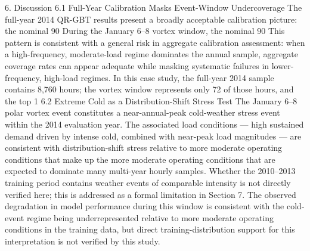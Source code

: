 6. Discussion
6.1 Full-Year Calibration Masks Event-Window Undercoverage
The full-year 2014 QR-GBT results present a broadly acceptable calibration picture: the nominal 90%
During the January 6–8 vortex window, the nominal 90%
This pattern is consistent with a general risk in aggregate calibration assessment: when a high-frequency, moderate-load regime dominates the annual sample, aggregate coverage rates can appear adequate while masking systematic failures in lower-frequency, high-load regimes. In this case study, the full-year 2014 sample contains 8,760 hours; the vortex window represents only 72 of those hours, and the top 1%
6.2 Extreme Cold as a Distribution-Shift Stress Test
The January 6–8 polar vortex event constitutes a near-annual-peak cold-weather stress event within the 2014 evaluation year. The associated load conditions — high sustained demand driven by intense cold, combined with near-peak load magnitudes — are consistent with distribution-shift stress relative to more moderate operating conditions that make up the more moderate operating conditions that are expected to dominate many multi-year hourly samples. Whether the 2010–2013 training period contains weather events of comparable intensity is not directly verified here; this is addressed as a formal limitation in Section 7. The observed degradation in model performance during this window is consistent with the cold-event regime being underrepresented relative to more moderate operating conditions in the training data, but direct training-distribution support for this interpretation is not verified by this study.
